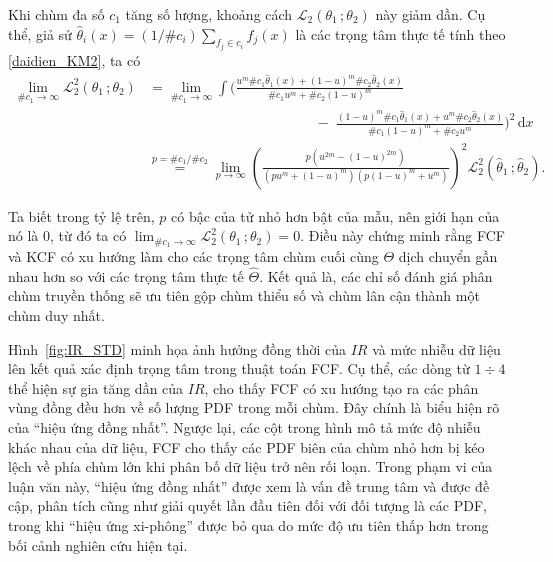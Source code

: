 \documentclass[a4paper,oneside]{book} %
\theoremstyle{plain}
\theoremstyle{plain}
\theoremstyle{nonumberplain}
\begin{document}
  Khi chùm đa số $c_1$ tăng số lượng, khoảng cách $\mathcal{L}_2(\theta_1\,;\theta_2)$ này giảm dần. Cụ thể, giả sử $\widehat\theta_i(x)=(1/\#c_i)\sum_{f_j\in c_i} f_j(x)$ là các trọng tâm thực tế tính theo \eqref{daidien_KM2}, ta có
\begin{align*}
	\lim_{\#c_1 \to \infty} \mathcal{L}^2_2(\theta_1\,;\theta_2)
	&= \lim_{\#c_1 \to \infty}
	\int\Bigg(
	\frac{u^m  \#c_1\widehat\theta_1(x) + (1-u)^m \#c_2\widehat\theta_2(x)}
	{\#c_1u^m + \#c_2(1-u)^m}
	\\
	&\hspace{5cm}
	-\;
	\frac{(1-u)^m \#c_1\widehat\theta_1(x) + u^m \#c_2\widehat\theta_2(x)}
	{\#c_1(1-u)^m + \#c_2u^m}
	\Bigg)^{2}\mathrm{\,d}x
	\\[6pt]
	&\stackrel{p=\#c_1/\#c_2}{=}
	\lim_{p \to \infty}
	\left(
	\frac{p(u^{2m} - (1-u)^{2m})}
	{(p u^m + (1-u)^m)(p(1-u)^m + u^m)}
	\right)^{2}
	\mathcal{L}^2_2(\widehat{\theta}_1\,;\widehat{\theta}_2).
\end{align*}

  
  Ta biết trong tỷ lệ trên, $p$ có bậc của tử nhỏ hơn bật của mẫu, nên giới hạn của nó là $0$, từ đó ta có
  $ \lim_{\#c_1 \to \infty} \mathcal{L}^2_2(\theta_1\,;\theta_2) = 0 $. Điều này chứng minh rằng FCF và KCF có xu hướng làm cho các trọng tâm chùm cuối cùng $\Theta$ dịch chuyển gần nhau hơn so với các trọng tâm thực tế $\widehat{\Theta}$. Kết quả là, các chỉ số đánh giá phân chùm truyền thống sẽ ưu tiên gộp chùm thiểu số và chùm lân cận thành một chùm duy nhất.

Hình~\ref{fig:IR_STD} minh họa ảnh hưởng đồng thời của $IR$ và mức nhiễu dữ liệu lên kết quả xác định trọng tâm trong thuật toán FCF. Cụ thể, các dòng từ $1\div4$ thể hiện sự gia tăng dần của $IR$, cho thấy FCF có xu hướng tạo ra các phân vùng đồng đều hơn về số lượng PDF trong mỗi chùm. Đây chính là biểu hiện rõ của ``hiệu ứng đồng nhất''. 
Ngược lại, các cột trong hình mô tả mức độ nhiễu khác nhau của dữ liệu, FCF cho thấy các PDF biên của chùm nhỏ hơn bị kéo lệch về phía chùm lớn khi phân bố dữ liệu trở nên rối loạn.
Trong phạm vi của luận văn này, “hiệu ứng đồng nhất” được xem là vấn đề trung tâm và được đề cập, phân tích cũng như giải quyết lần đầu tiên đối với đối tượng là các PDF, trong khi “hiệu ứng xi-phông” được bỏ qua do mức độ ưu tiên thấp hơn trong bối cảnh nghiên cứu hiện tại.
\end{document}
